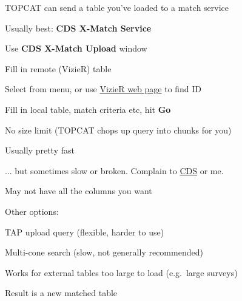 \documentclass[20pt,landscape]{foils}
\newcommand{\bhref}[2]{\href{#1}{{\color{blue}#2}}}
\newcommand{\buttimg}[1]
           {\mbox{\vtop{\vskip-2ex\hbox{\texttt{[image: \#1]}}}}}
\begin{document}
\begin{list0}
  \item TOPCAT can send a table you've loaded to a match service
  \item Usually best: {\bf CDS X-Match Service}
  \begin{list2big}
    \item Use \buttimg{xm3.png} {\bf CDS X-Match Upload} window
    \item Fill in remote (VizieR) table
    \begin{list3}
      \item Select from menu, or use
            \bhref{https://vizier.cds.unistra.fr/}{VizieR web page}
            to find ID
    \end{list3}
    \item Fill in local table, match criteria etc, hit {\bf Go}
    \item No size limit (TOPCAT chops up query into chunks for you)
    \item Usually pretty fast
    \begin{list2big}
      \item[] ... but sometimes slow or broken.
              Complain to \bhref{mailto:cds-question@unistra.fr}{CDS} or me.
    \end{list2big}
    \item May not have all the columns you want
  \end{list2big}
  \item Other options:
  \begin{list2big}
    \item TAP upload query (flexible, harder to use)
    \item Multi-cone search (slow, not generally recommended)
  \end{list2big}
  \item Works for external tables too large to load (e.g.\ large surveys)
  \item Result is a new matched table
\end{list0}

\end{document}
